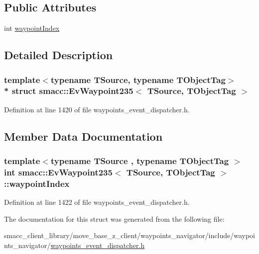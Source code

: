 \subsection*{Public Attributes}
\begin{DoxyCompactItemize}
\item 
int \hyperlink{structsmacc_1_1EvWaypoint235_a2569c9adcb08eb48f96850978c84489b}{waypoint\+Index}
\end{DoxyCompactItemize}


\subsection{Detailed Description}
\subsubsection*{template$<$typename T\+Source, typename T\+Object\+Tag$>$\\*
struct smacc\+::\+Ev\+Waypoint235$<$ T\+Source, T\+Object\+Tag $>$}



Definition at line 1420 of file waypoints\+\_\+event\+\_\+dispatcher.\+h.



\subsection{Member Data Documentation}
\subsubsection[{\texorpdfstring{waypoint\+Index}{waypointIndex}}]{\setlength{\rightskip}{0pt plus 5cm}template$<$typename T\+Source , typename T\+Object\+Tag $>$ int {\bf smacc\+::\+Ev\+Waypoint235}$<$ T\+Source, T\+Object\+Tag $>$\+::waypoint\+Index}\hypertarget{structsmacc_1_1EvWaypoint235_a2569c9adcb08eb48f96850978c84489b}{}\label{structsmacc_1_1EvWaypoint235_a2569c9adcb08eb48f96850978c84489b}


Definition at line 1422 of file waypoints\+\_\+event\+\_\+dispatcher.\+h.



The documentation for this struct was generated from the following file\+:\begin{DoxyCompactItemize}
\item 
smacc\+\_\+client\+\_\+library/move\+\_\+base\+\_\+z\+\_\+client/waypoints\+\_\+navigator/include/waypoints\+\_\+navigator/\hyperlink{waypoints__event__dispatcher_8h}{waypoints\+\_\+event\+\_\+dispatcher.\+h}\end{DoxyCompactItemize}
